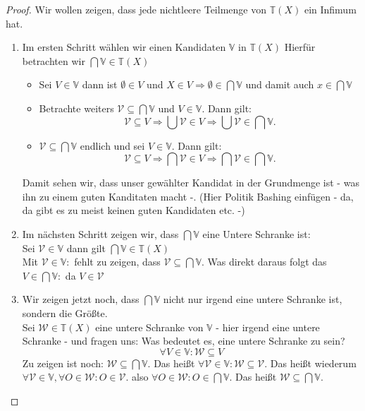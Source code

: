 \begin{proof}
  Wir wollen zeigen, dass jede nichtleere Teilmenge von $\mathbb{T}(X)$ ein Infimum hat.
 \begin{enumerate}
    \item Im ersten Schritt wählen wir einen Kandidaten  $\mathbb{V}$ in $\mathbb{T}(X)$ 
    Hierfür betrachten wir $\bigcap \mathbb{V} \in \mathbb{T}(X)$
    \begin{itemize}
      \item Sei $V \in \mathbb{V}$ dann ist 
      $\emptyset \in V$ und $X \in V \Rightarrow \emptyset \in \bigcap \mathbb{V}$
      und damit auch $x \in \bigcap \mathbb{V}$ 
      \item Betrachte weiters $\mathcal{V} \subseteq \bigcap \mathbb{V}$ und $V \in \mathbb{V}$. 
      Dann gilt:
      $$ 
      \mathcal{V} \subseteq V \Rightarrow \bigcup \mathcal{V} \in V \Rightarrow \bigcup \mathcal{V} \in \bigcap \mathbb{V}.
      $$
      \item
      $\mathcal{V} \subseteq \bigcap \mathbb{V}$ endlich und sei $V \in \mathbb{V}$. 
      Dann gilt:
      $$ 
      \mathcal{V} \subseteq V \Rightarrow \bigcap \mathcal{V} \in V \Rightarrow \bigcap \mathcal{V} \in \bigcap \mathbb{V}.
      $$
    \end{itemize}
    Damit sehen wir, dass unser gewählter Kandidat in der Grundmenge ist - was ihn zu einem guten Kanditaten macht -.
    (Hier Politik Bashing einfügen - da, da gibt es zu meist keinen guten Kandidaten etc. -) 

    \item Im nächsten Schritt zeigen wir, dass $\bigcap \mathbb{V}$ eine Untere Schranke ist:\\
   Sei $\mathcal{V}  \in \mathbb{V} $ dann gilt $\bigcap \mathbb{V} \in \mathbb{T}(X)$ \\
   Mit  $\mathcal{V}  \in \mathbb{V} :$ fehlt zu zeigen, dass $\mathcal{V} \subseteq \bigcap \mathbb{V}$.
   Was direkt daraus folgt das $V \in \bigcap \mathbb{V} :$ da $V \in \mathcal{V}$

    \item Wir zeigen jetzt noch, dass $\bigcap \mathbb{V}$ nicht nur irgend eine untere Schranke ist,
    sondern die Größte.\\
    Sei $\mathcal{W} \in \mathbb{T}(X)$ eine untere Schranke von $\mathbb{V}$
     - hier irgend eine untere Schranke - und fragen uns:
    Was bedeutet es, eine untere Schranke zu sein?
    $$\forall V \in \mathbb{V}: \mathcal{W} \subseteq V$$
    Zu zeigen ist noch: $\mathcal{W} \subseteq \bigcap \mathbb{V}$.
    Das heißt $\forall \mathcal{V} \in \mathbb{V}: \mathcal{W} \subseteq \mathcal{V}$.
    Das heißt wiederum $\forall \mathcal{V} \in \mathbb{V}, \forall O \in \mathcal{W}: O \in \mathcal{V}$.
    also $\forall O \in \mathcal{W}: O \in \bigcap \mathbb{V}$.
    Das heißt $\mathcal{W} \subseteq \bigcap \mathbb{V}$.
  \end{enumerate}
\end{proof}



